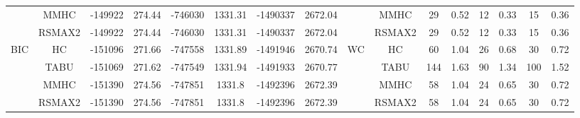 \begin{table}[h]
{\begin{tabular}{cc||cc|cc|cc||cc|cc|cc|cc}
& MMHC &	-149922 & 	274.44 & 	-746030 & 	1331.31 & 	-1490337 & 	2672.04 & 	& MMHC &	29 & 	0.52 & 	12 & 	0.33 & 	15 & 	0.36\tabularnewline													
& RSMAX2 &	-149922 & 	274.44 & 	-746030 & 	1331.31 & 	-1490337 & 	2672.04 & 	& RSMAX2 &	29 & 	0.52 & 	12 & 	0.33 & 	15 & 	0.36\tabularnewline													
\hline																										
\multirow{4}{*}{BIC} & HC &	-151096 & 	271.66 & 	-747558 & 	1331.89 & 	-1491946 & 	2670.74 & 	\multirow{4}{*}{WC} & HC &	60 & 	1.04 & 	26 & 	0.68 & 	30 & 	0.72\tabularnewline													
& TABU &	-151069 & 	271.62 & 	-747549 & 	1331.94 & 	-1491933 & 	2670.77 & 	& TABU &	144 & 	1.63 & 	90 & 	1.34 & 	100 & 	1.52\tabularnewline													
& MMHC &	-151390 & 	274.56 & 	-747851 & 	1331.8 & 	-1492396 & 	2672.39 & 	& MMHC &	58 & 	1.04 & 	24 & 	0.65 & 	30 & 	0.72\tabularnewline													
& RSMAX2 &	-151390 & 	274.56 & 	-747851 & 	1331.8 & 	-1492396 & 	2672.39 & 	& RSMAX2 &	58 & 	1.04 & 	24 & 	0.65 & 	30 & 	0.72\tabularnewline													
\hline																										
\end{tabular}																										
}																										
\end{table}																										


